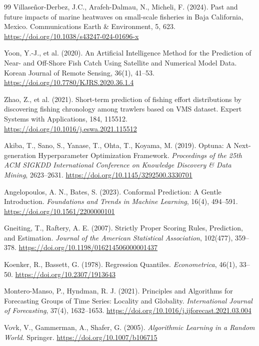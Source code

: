 \begin{thebibliography}{99}
Villaseñor-Derbez, J.C., Arafeh-Dalmau, N., Micheli, F. (2024). Past and future impacts of marine heatwaves on small-scale fisheries in Baja California, Mexico. Communications Earth \& Environment, 5, 623. \url{https://doi.org/10.1038/s43247-024-01696-x}

Yoon, Y.-J., et al. (2020). An Artificial Intelligence Method for the Prediction of Near- and Off-Shore Fish Catch Using Satellite and Numerical Model Data. Korean Journal of Remote Sensing, 36(1), 41–53. \url{https://doi.org/10.7780/KJRS.2020.36.1.4}

Zhao, Z., et al. (2021). Short-term prediction of fishing effort distributions by discovering fishing chronology among trawlers based on VMS dataset. Expert Systems with Applications, 184, 115512. \url{https://doi.org/10.1016/j.eswa.2021.115512}

Akiba, T., Sano, S., Yanase, T., Ohta, T., Koyama, M. (2019). Optuna: A Next-generation Hyperparameter Optimization Framework. \emph{Proceedings of the 25th ACM SIGKDD International Conference on Knowledge Discovery \& Data Mining}, 2623--2631. \url{https://doi.org/10.1145/3292500.3330701}

Angelopoulos, A. N., Bates, S. (2023). Conformal Prediction: A Gentle Introduction. \emph{Foundations and Trends in Machine Learning}, 16(4), 494--591. \url{https://doi.org/10.1561/2200000101}

Gneiting, T., Raftery, A. E. (2007). Strictly Proper Scoring Rules, Prediction, and Estimation. \emph{Journal of the American Statistical Association}, 102(477), 359--378. \url{https://doi.org/10.1198/016214506000001437}

Koenker, R., Bassett, G. (1978). Regression Quantiles. \emph{Econometrica}, 46(1), 33--50. \url{https://doi.org/10.2307/1913643}

Montero-Manso, P., Hyndman, R. J. (2021). Principles and Algorithms for Forecasting Groups of Time Series: Locality and Globality. \emph{International Journal of Forecasting}, 37(4), 1632--1653. \url{https://doi.org/10.1016/j.ijforecast.2021.03.004}

Vovk, V., Gammerman, A., Shafer, G. (2005). \emph{Algorithmic Learning in a Random World}. Springer. \url{https://doi.org/10.1007/b106715}

\end{thebibliography}
